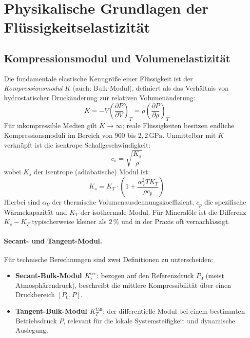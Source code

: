 ﻿\documentclass[a4paper,12pt]{scrreprt}
\theoremstyle{definition}
\begin{document}
\section{Physikalische Grundlagen der Flüssigkeitselastizität}

\subsection{Kompressionsmodul und Volumenelastizität}

Die fundamentale elastische Kenngröße einer Flüssigkeit ist der
\emph{Kompressionsmodul} $K$ (auch: Bulk-Modul), definiert als das Verhältnis
von hydrostatischer Druckänderung zur relativen Volumenänderung:
\begin{equation}
  K = -V \left(\frac{\partial P}{\partial V}\right)_T
    = \rho \left(\frac{\partial P}{\partial \rho}\right)_T
  \label{eq:bulk_modul}
\end{equation}
Für inkompressible Medien gilt $K \to \infty$; reale Flüssigkeiten besitzen
endliche Kompressionsmoduli im Bereich von $900$ bis $2{,}2\,\mathrm{GPa}$.
Unmittelbar mit $K$ verknüpft ist die isentrope Schallgeschwindigkeit:
\begin{equation}
  c_s = \sqrt{\frac{K_s}{\rho}}
  \label{eq:schallgeschw}
\end{equation}
wobei $K_s$ der isentrope (adiabatische) Modul ist:
\begin{equation}
  K_s = K_T \cdot \left(1 + \frac{\alpha_V^2 T K_T}{\rho c_p}\right)
  \label{eq:ks_kt}
\end{equation}
Hierbei sind $\alpha_V$ der thermische Volumenausdehnungskoeffizient,
$c_p$ die spezifische Wärmekapazität und $K_T$ der isothermale Modul.
Für Mineralöle ist die Differenz $K_s - K_T$ typischerweise kleiner als
$2\,\%$ und in der Praxis oft vernachlässigt.

\paragraph{Secant- und Tangent-Modul.}
Für technische Berechnungen sind zwei Definitionen zu unterscheiden:
\begin{itemize}
  \item \textbf{Secant-Bulk-Modul $K_s^{\mathrm{sec}}$}: bezogen auf den
    Referenzdruck $P_0$ (meist Atmosphärendruck), beschreibt die mittlere
    Kompressibilität über einen Druckbereich $[P_0, P]$.
  \item \textbf{Tangent-Bulk-Modul $K_T^{\mathrm{tan}}$}: der differentielle
    Modul bei einem bestimmten Betriebsdruck $P$, relevant für die lokale
    Systemsteifigkeit und dynamische Auslegung.
\end{itemize}
\end{document}

